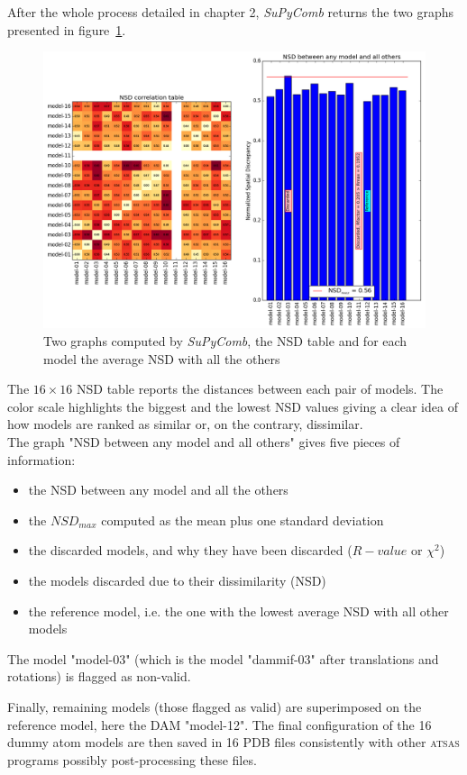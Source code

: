 \documentclass[a4paper, 11pt]{report}
\begin{document}
After the whole process detailed in chapter 2, \textit{SuPyComb} 
returns the two graphs presented in figure~\ref{fgr:nsd}. 
\begin{figure}
\centering
\includegraphics[scale=0.45]{nsd.png}
\caption{Two graphs computed by \textit{SuPyComb}, the NSD table and 
         for each model the average NSD with all the others}
\label{fgr:nsd}
\end{figure}
The $16 \times 16$ NSD table reports the distances between each pair 
of models. 
The color scale highlights the biggest and the lowest NSD values 
giving a clear idea of how models are ranked as similar or, on the 
contrary, dissimilar.\\
The graph "NSD between any model and all others" gives five pieces of 
information:
\begin{itemize}
\item the NSD between any model and all the others
\item the $NSD_{max}$ computed as the mean plus one standard deviation
\item the discarded models, and why they have been discarded ($R-value$ 
      or $\chi^{2}$)
\item the models discarded due to their dissimilarity (NSD)
\item the reference model, i.e. the one with the lowest average NSD with 
      all other models
\end{itemize}
The model "model-03" (which is the model "dammif-03" after 
translations and rotations) is flagged as non-valid.

Finally, remaining models (those flagged as valid) are superimposed 
on the reference model, here the DAM "model-12". 
The final configuration of the 16 dummy atom models are then saved in 
16 PDB files consistently with other \textsc{atsas} programs possibly 
post-processing these files.
\end{document}
